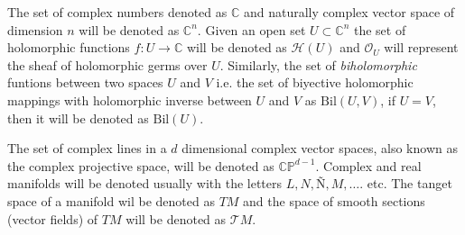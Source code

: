 \documentclass[12pt,twoside,a4paper]{report}
\newcommand{\co}{\ensuremath{\mathbb C }}
\newcommand{\con}{\ensuremath{\mathbb{C}^n}}
\newcommand{\cp}{\ensuremath{\mathbb{CP}}}
\newcommand{\osheaf}{\ensuremath{\mathcal O }}
\begin{document}
The set of complex numbers denoted as $\co$ and naturally complex vector space of dimension $n$ will be denoted as $\con$. Given an open set $U\subset\con$ the set of holomorphic functions $f:U\rightarrow\co$ will be denoted as $\mathcal{H}(U)$ and $\osheaf_{U}$ will represent the sheaf of holomorphic germs over $U$. Similarly, the set of \emph{biholomorphic} funtions between two spaces $U$ and $V$ i.e. the set of biyective holomorphic mappings with holomorphic inverse between $U$ and $V$ as $\mathrm{Bil}(U,V)$, if $U=V$, then it will be denoted as $\mathrm{Bil}(U).$

The set of complex lines in a $d$ dimensional complex vector spaces, also known as the complex projective space, will be denoted as $\cp^{d-1}$. Complex and real manifolds will be denoted usually with the letters $L, N, Ñ, M,\dots$. etc. The tanget space of a manifold wil be denoted as $TM$ and the space of smooth sections (vector fields) of $TM$ will be denoted as $\mathcal{T}M$.
\end{document}

